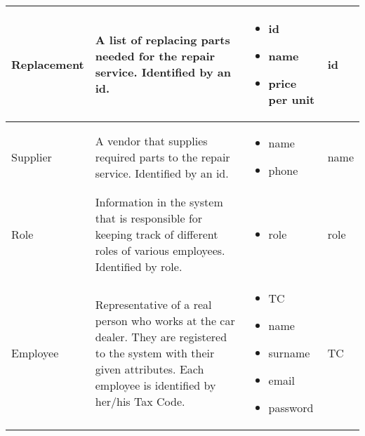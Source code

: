 \begin{longtable}{|p{}|p{} |p{}|p{} |}
Replacement & A list of replacing parts needed for the repair service. Identified by an id. & \begin{itemize}
    \vspace{-1em}
    \item id
    \item name
	\item price per unit
    \end{itemize}
& id \\\hline

Supplier & A vendor that supplies required parts to the repair service. Identified by an id. & \begin{itemize}
    \vspace{-1em}
    \item name
    \item phone
\end{itemize}
&  name\\\hline

Role & Information in the system that is responsible for keeping track of different roles of various employees. Identified by role. & \begin{itemize}
    \vspace{-1em}
    \item role
\end{itemize}
&  role\\\hline

Employee & Representative of a real person who works at the car dealer. They are registered to the system with their given attributes. Each employee is identified by her/his Tax Code. & \begin{itemize}
    \vspace{-1em}
    \item TC
    \item name
    \item surname
    \item email
    \item password
\end{itemize}
&  TC\\\hline

\end{longtable}